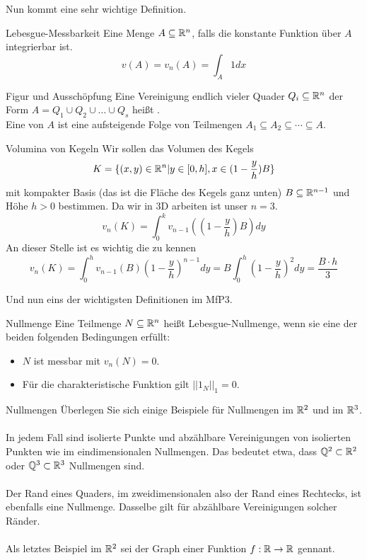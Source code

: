 Nun kommt eine sehr wichtige Definition.
\begin{Def}{Lebesgue-Messbarkeit}
Eine Menge $A\subseteq \mathbb{R}^n$, falls die konstante Funktion über $A$ integrierbar ist.
$$v(A)=v_n(A)=\int_A 1dx$$
\end{Def}
\begin{Def}{Figur und Ausschöpfung}
Eine Vereinigung endlich vieler Quader $Q_i\subseteq \mathbb{R}^n$ der Form $A=Q_1\cup Q_2 \cup \dots \cup Q_s$ heißt . \\
Eine  von $A$ ist eine aufsteigende Folge von Teilmengen $A_1\subseteq A_2 \subseteq \cdots \subseteq A$.
\end{Def}
\begin{Beispiel}{Volumina von Kegeln}
Wir sollen das Volumen des Kegels
$$K=\{(x,y)\in \mathbb{R}^n | y\in [0,h], x\in (1-\frac{y}{h})B\}$$
mit kompakter Basis (das ist die Fläche des Kegels ganz unten) $B\subseteq \mathbb{R}^{n-1}$ und Höhe $h>0$ bestimmen. Da wir in 3D arbeiten ist unser $n=3$.
$$v_n(K)=\int_0^k v_{n-1} ((1-\frac{y}{h})B)dy$$
An dieser Stelle ist es wichtig die  zu kennen
$$v_n(K)=\int_0^h v_{n-1}(B)(1-\frac{y}{h})^{n-1}dy=B\int_0^h (1-\frac{y}{h})^2 dy=\frac{B\cdot h}{3}$$
\end{Beispiel}
Und nun eins der wichtigsten Definitionen im MfP3.
\begin{Def}{Nullmenge}
Eine Teilmenge $N\subseteq \mathbb{R}^n$ heißt Lebesgue-Nullmenge, wenn sie eine der beiden folgenden Bedingungen erfüllt:
\begin{itemize}
    \item $N$ ist messbar mit $v_n(N)=0$.
    \item Für die charakteristische Funktion gilt $||1_{N}||_1=0$.
\end{itemize}
\end{Def}
\begin{Beispiel}{Nullmengen}
Überlegen Sie sich einige Beispiele für Nullmengen im $\mathbb{R}^2$ und im $\mathbb{R}^3$. \\ \\
In jedem Fall sind isolierte Punkte und abzählbare Vereinigungen von isolierten Punkten wie im eindimensionalen Nullmengen. Das bedeutet etwa, dass $\mathbb{Q}^2\subset \mathbb{R}^2$ oder $\mathbb{Q}^3 \subset \mathbb{R}^3$ Nullmengen sind. \\ \\
Der Rand eines Quaders, im zweidimensionalen also der Rand eines Rechtecks, ist ebenfalls eine Nullmenge. Dasselbe gilt für abzählbare Vereinigungen solcher Ränder. \\ \\
Als letztes Beispiel im $\mathbb{R}^2$ sei der Graph einer Funktion $f:\mathbb{R}\rightarrow \mathbb{R}$ gennant.
\end{Beispiel}
